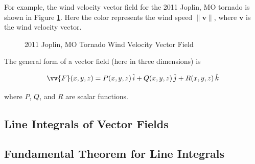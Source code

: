 \documentclass{article}
\theoremstyle{definition}
\begin{document}
\bigskip
\noindent
For example, the wind velocity vector field for the 2011 
Joplin, MO tornado \cite{joplin_missouri_tornado_2011}
is shown in Figure \ref{fig:wind_velocity_vector_field}.
Here the color represents the wind speed $\| \mathbf{v} \|$, 
where $\mathbf{v}$ is the wind velocity vector.


\bigskip
\begin{figure}[H]
\caption{2011 Joplin, MO Tornado Wind Velocity Vector Field}
\label{fig:wind_velocity_vector_field}
\end{figure}


\bigskip
\noindent
The general form of a vector field (here in three dimensions) is

\smallskip
\begin{equation*}
\vv{F}(x,y,z) = P(x,y,z) \, \hat{i} + Q(x,y,z) \, \hat{j} + R(x,y,z) \, \hat{k}
\end{equation*}

\bigskip
\noindent
where $P$, $Q$, and $R$ are scalar functions.


\subsection{Line Integrals of Vector Fields}

\subsection{Fundamental Theorem for Line Integrals}
\end{document}
